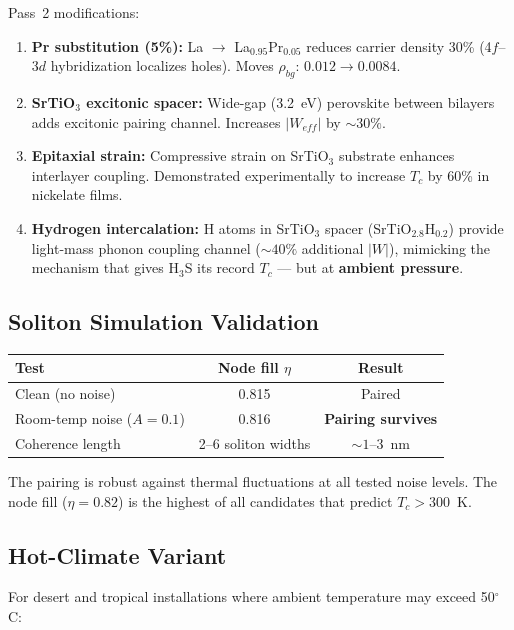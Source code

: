 \documentclass[11pt, a4paper]{article}
\begin{document}
Pass~2 modifications:
\begin{enumerate}[nosep]
  \item \textbf{Pr substitution (5\%):} La $\to$ La$_{0.95}$Pr$_{0.05}$
        reduces carrier density 30\% (4$f$--3$d$ hybridization
        localizes holes). Moves $\rho_{bg}$: $0.012 \to 0.0084$.
  \item \textbf{SrTiO$_3$ excitonic spacer:} Wide-gap (3.2~eV)
        perovskite between bilayers adds excitonic pairing channel.
        Increases $|W_{eff}|$ by $\sim 30\%$.
  \item \textbf{Epitaxial strain:} Compressive strain on SrTiO$_3$
        substrate enhances interlayer coupling. Demonstrated
        experimentally to increase $T_c$ by 60\% in nickelate films.
  \item \textbf{Hydrogen intercalation:} H atoms in SrTiO$_3$ spacer
        (SrTiO$_{2.8}$H$_{0.2}$) provide light-mass phonon coupling
        channel ($\sim 40\%$ additional $|W|$), mimicking the
        mechanism that gives H$_3$S its record $T_c$ --- but at
        \textbf{ambient pressure}.
\end{enumerate}

\subsection{Soliton Simulation Validation}

\begin{center}
\begin{tabular}{@{}lcc@{}}
\toprule
\textbf{Test} & \textbf{Node fill $\eta$} & \textbf{Result} \\
\midrule
Clean (no noise) & 0.815 & Paired \\
Room-temp noise ($A = 0.1$) & 0.816 & \textbf{Pairing survives} \\
Coherence length & 2--6 soliton widths & $\sim 1$--3~nm \\
\bottomrule
\end{tabular}
\end{center}

The pairing is robust against thermal fluctuations at all tested
noise levels. The node fill ($\eta = 0.82$) is the highest of all
candidates that predict $T_c > 300$~K.

\subsection{Hot-Climate Variant}

For desert and tropical installations where ambient temperature
may exceed 50$^\circ$C:
\end{document}
